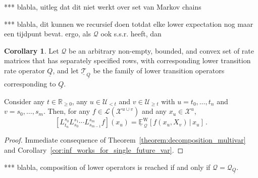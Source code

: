 \documentclass[10pt]{paper}
\theoremstyle{definition}
\newtheorem{corollary}[theorem]{Corollary}
\newcommand{\reals}{\mathbb{R}}
\newcommand{\realsnonneg}{\reals_{\geq 0}}
\newcommand{\states}{\mathcal{X}}
\newcommand{\gambles}{\mathcal{L}}
\newcommand{\rateset}{\mathcal{Q}}
\newcommand{\lrate}{\underline{Q}}
\begin{document}
*** blabla, uitleg dat dit niet werkt over set van Markov chains

*** blabla, dit kunnen we recursief doen totdat elke lower expectation nog maar een tijdpunt bevat. ergo, als $\rateset$ ook s.s.r. heeft, dan

\begin{corollary}
Let $\rateset$ be an arbitrary non-empty, bounded, and convex set of rate matrices that has separately specified rows, with corresponding lower transition rate operator $\lrate$, and let $\underline{\mathcal{T}}_{\lrate}$ be the family of lower transition operators corresponding to $\lrate$. 

Consider any $t\in\realsnonneg$, any $u\in\mathcal{U}_{<t}$ and $v\in\mathcal{U}_{\geq t}$ with $u=t_0,\ldots,t_n$ and $v={s_0,\ldots,s_m}$. Then, for any $f\in\gambles(\states^{u\cup v})$ and any $x_u\in\states^u$,
\begin{equation*}
\left[L_{t_n}^{s_0}L_{s_0}^{s_1}\cdots L_{s_{m-1}}^{s_m}f\right](x_u) = \underline{\mathbb{E}}^{\mathrm{W}}_{\,\rateset}[f(x_u,X_v)\,\vert\,x_u]\,.
\end{equation*}
\end{corollary}
\begin{proof}
Immediate consequence of Theorem~\ref{theorem:decomposition_multivar} and Corollary~\ref{cor:inf_works_for_single_future_var}.
\end{proof}

*** blabla, composition of lower operators is reached if and only if $\rateset=\rateset_{\lrate}$.
\end{document}
